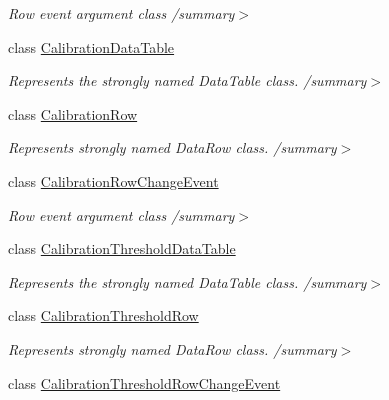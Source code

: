 \begin{DoxyCompactItemize}
\begin{DoxyCompactList}\small\item\em Row event argument class /summary$>$ \end{DoxyCompactList}\item 
class \hyperlink{class_env_int_1_1_win32_1_1_field_tech_1_1_manager_1_1_data_sets_1_1_guide_ware_mobile_data_set_1_1_calibration_data_table}{Calibration\+Data\+Table}
\begin{DoxyCompactList}\small\item\em Represents the strongly named Data\+Table class. /summary$>$ \end{DoxyCompactList}\item 
class \hyperlink{class_env_int_1_1_win32_1_1_field_tech_1_1_manager_1_1_data_sets_1_1_guide_ware_mobile_data_set_1_1_calibration_row}{Calibration\+Row}
\begin{DoxyCompactList}\small\item\em Represents strongly named Data\+Row class. /summary$>$ \end{DoxyCompactList}\item 
class \hyperlink{class_env_int_1_1_win32_1_1_field_tech_1_1_manager_1_1_data_sets_1_1_guide_ware_mobile_data_set_84870cfb39b084eaa7965416caa9d277}{Calibration\+Row\+Change\+Event}
\begin{DoxyCompactList}\small\item\em Row event argument class /summary$>$ \end{DoxyCompactList}\item 
class \hyperlink{class_env_int_1_1_win32_1_1_field_tech_1_1_manager_1_1_data_sets_1_1_guide_ware_mobile_data_set_e4a98fb4b531becb042ae997c9d8a15c}{Calibration\+Threshold\+Data\+Table}
\begin{DoxyCompactList}\small\item\em Represents the strongly named Data\+Table class. /summary$>$ \end{DoxyCompactList}\item 
class \hyperlink{class_env_int_1_1_win32_1_1_field_tech_1_1_manager_1_1_data_sets_1_1_guide_ware_mobile_data_set_1_1_calibration_threshold_row}{Calibration\+Threshold\+Row}
\begin{DoxyCompactList}\small\item\em Represents strongly named Data\+Row class. /summary$>$ \end{DoxyCompactList}\item 
class \hyperlink{class_env_int_1_1_win32_1_1_field_tech_1_1_manager_1_1_data_sets_1_1_guide_ware_mobile_data_set_fbaa872ead219fa1546c6a3dbe0bab70}{Calibration\+Threshold\+Row\+Change\+Event}

\end{DoxyCompactItemize}

